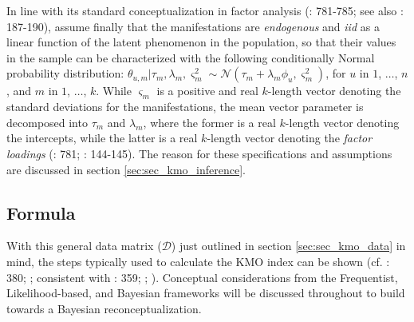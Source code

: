 \documentclass[
  10pt,
  a4paper,
  twoside]{article}
\begin{document}
In line with its standard conceptualization in factor analysis (: 781-785; see also : 187-190), assume finally that the manifestations are \emph{endogenous} and \emph{iid} as a linear function of the latent phenomenon in the population, so that their values in the sample can be characterized with the following conditionally Normal probability distribution: \(\theta_{u,m} | \tau_m, \lambda_m, \varsigma_m^2 \sim \mathcal{N}(\tau_m + \lambda_m \phi_u, \varsigma_m^2)\), for \(u\) in \(1\), \(\dots\), \(n\), and \(m\) in \(1\), \(\dots\), \(k\). While \(\varsigma_m\) is a positive and real \(k\)-length vector denoting the standard deviations for the manifestations, the mean vector parameter is decomposed into \(\tau_m\) and \(\lambda_m\), where the former is a real \(k\)-length vector denoting the intercepts, while the latter is a real \(k\)-length vector denoting the \emph{factor loadings} (: 781; : 144-145). The reason for these specifications and assumptions are discussed in section \ref{sec:sec_kmo_inference}.

\subsection{Formula}\label{sec:sec_kmo_formula}

With this general data matrix (\(\mathcal{D}\)) just outlined in section \ref{sec:sec_kmo_data} in mind, the steps typically used to calculate the KMO index can be shown (cf. : 380; ; consistent with : 359; ; ). Conceptual considerations from the Frequentist, Likelihood-based, and Bayesian frameworks will be discussed throughout to build towards a Bayesian reconceptualization.
\end{document}
